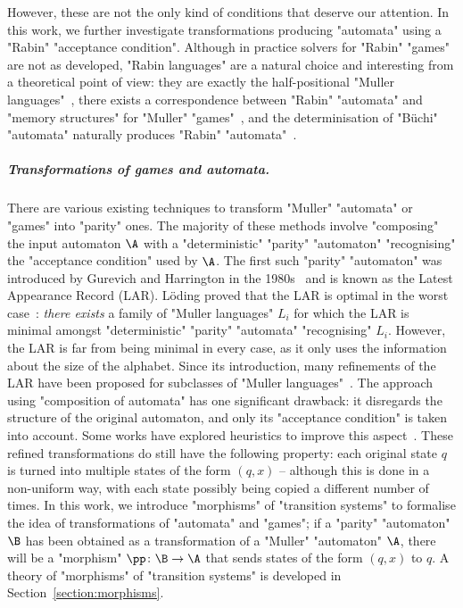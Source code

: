 \documentclass{theoretics}
\begin{document}
However, these are not the only kind of conditions that deserve our attention. In this work, we further investigate transformations producing "automata" using a "Rabin" "acceptance condition". Although in practice solvers for "Rabin" "games" are not as developed, "Rabin languages" are a natural choice and interesting from a theoretical point of view: they are exactly the half-positional "Muller languages"~\cite{Zielonka1998infinite}, there exists a correspondence between "Rabin" "automata" and "memory structures" for "Muller" "games"~\cite{Casares2021Chromatic, CCL22SizeGFG}, and the determinisation of "B\"uchi" "automata" naturally produces "Rabin" "automata"~\cite{FKVW15Profile,Safra1988onthecomplexity, Schewe2009tighter}.


\subparagraph{Transformations of games and automata.} There are various existing techniques to transform "Muller" "automata" or "games" into "parity" ones. The majority of these methods involve "composing" the input automaton $\A$ with a "deterministic" "parity" "automaton" "recognising" the "acceptance condition" used by $\A$. The first such "parity" "automaton" was introduced by Gurevich and Harrington in the 1980s~\cite{Gurevich1982trees} and is known as the Latest Appearance Record (LAR).
L\"oding proved that the LAR is optimal in the worst case~\cite{Loding1999Optimal}: \textit{there exists} a family of "Muller languages" $L_i$
for which the LAR is minimal amongst "deterministic" "parity" "automata" "recognising" $L_i$.
However, the LAR is far from being minimal in every case, as it only uses the information about the size of the alphabet.
Since its introduction, many refinements of the LAR have been proposed for subclasses of "Muller languages"~\cite{Kretinski2017IAR,Loding1999Optimal}. 
The approach using "composition of automata" has one significant drawback: it disregards the structure of the original automaton, and only its "acceptance condition" is taken into account. Some works have explored heuristics to improve this aspect~\cite{KMWW21IARPreorders, MeyerSickert21OptimalPractical, RDP20PracticalParitizing}. These refined transformations do still have the following property: each original state $q$ is turned into multiple states of the form $(q, x)$ -- although this is done in a non-uniform way, with each state possibly being copied a different number of times.
In this work, we introduce "morphisms" of "transition systems" to formalise the idea of transformations of "automata" and "games"; if a "parity" "automaton" $\B$ has been obtained as a transformation of a "Muller" "automaton" $\A$, there will be a "morphism" $\pp\colon \B \to \A$ that sends states of the form $(q, x)$ to $q$. A theory of "morphisms" of "transition systems" is developed in Section~\ref{section:morphisms}.
\end{document}
